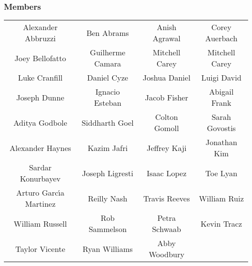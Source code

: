 \subsubsection*{Members}
\begin{table*}[htbp!]\small
    \centering
    \begin{tabular}{cccc}
        Alexander Abbruzzi & Ben Abrams & Anish Agrawal & Corey Auerbach \\
        Joey Bellofatto & Guilherme Camara & Mitchell Carey & Mitchell Carey \\
        Luke Cranfill & Daniel Cyze & Joshua Daniel & Luigi David \\
        Joseph Dunne & Ignacio Esteban & Jacob Fisher & Abigail Frank \\
        Aditya Godbole & Siddharth Goel & Colton Gomoll & Sarah Govostis \\
        Alexander Haynes & Kazim Jafri & Jeffrey Kaji & Jonathan Kim \\
        Sardar Konurbayev & Joseph Ligresti & Isaac Lopez & Toe Lyan \\
        Arturo Garc\'{\i}­a Martinez & Reilly Nash & Travis Reeves & William Ruiz \\
        William Russell & Rob Sammelson & Petra Schwaab & Kevin Tracz \\
        Taylor Vicente & Ryan Williams & Abby Woodbury &
    \end{tabular}
\end{table*}
